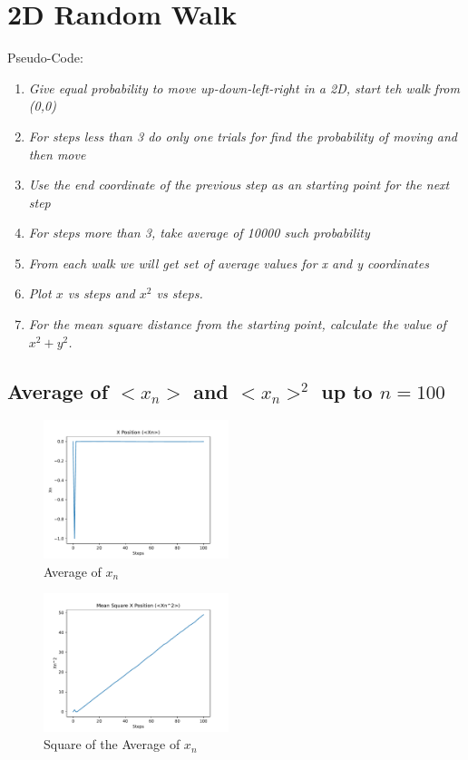 \documentclass[11pt]{article}
\begin{document}
\section{2D Random Walk} 
Pseudo-Code:
\begin{enumerate}
    \item \textit{Give equal probability to move up-down-left-right in a 2D, start teh walk from (0,0)}
    \item \textit{For steps less than 3 do only one trials for find the probability of moving and then move}
    \item \textit{Use the end coordinate of the previous step as an starting point for the next step}
    \item \textit{For steps more than 3, take average of 10000 such probability }
    \item \textit{From each walk we will get set of average values for x and y coordinates}
    \item \textit{Plot \( x \) vs steps and \( x^2 \) vs steps.}
    \item \textit{For the mean square distance from the starting point, calculate the value of \( x^2 + y^2 \).}    
\end{enumerate}
\subsection{Average of $<x_n>$ and $<x_n>^2$ up to $n = 100$}
\begin{figure}[H]
    \centering
    \includegraphics[width=0.48\textwidth, keepaspectratio]{(<Xn>).pdf}
    \caption{Average of \( x_n \)}
    \label{fig:17}
\end{figure}

\begin{figure}[H]
    \centering
    \includegraphics[width=0.48\textwidth, keepaspectratio]{(<Xn>)^2.pdf}
    \caption{Square of the Average of \( x_n \)}
    \label{fig:18}
\end{figure}
\end{document}
